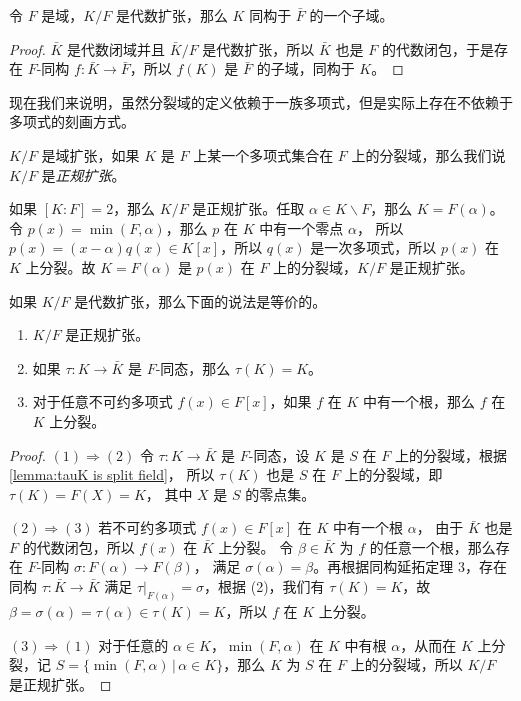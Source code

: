 \begin{corollary}
  令 $F$ 是域，$K/F$ 是代数扩张，那么 $K$ 同构于 $\bar F$ 的一个子域。
\end{corollary}
\begin{proof}
  $\bar K$ 是代数闭域并且 $\bar K/F$ 是代数扩张，所以 $\bar K$ 也是 $F$
  的代数闭包，于是存在 $F$-同构 $f: \bar K\to \bar F$，所以 $f(K)$
  是 $\bar F$ 的子域，同构于 $K$。
\end{proof}

现在我们来说明，虽然分裂域的定义依赖于一族多项式，但是实际上存在不依赖于
多项式的刻画方式。

\begin{definition}
  $K/F$ 是域扩张，如果 $K$ 是 $F$ 上某一个多项式集合在 $F$ 上的分裂域，那么我们说
  $K/F$ 是\emph{正规扩张}。
\end{definition}

\begin{example}
  如果 $[K:F]=2$，那么 $K/F$ 是正规扩张。任取 $\alpha\in K\smallsetminus F$，那么
  $K=F(\alpha)$。令 $p(x)=\min(F,\alpha)$，那么 $p$ 在 $K$ 中有一个零点 $\alpha$，
  所以 $p(x)=(x-\alpha)q(x)\in K[x]$，所以 $q(x)$ 是一次多项式，所以 $p(x)$ 在 $K$
  上分裂。故 $K=F(\alpha)$ 是 $p(x)$ 在 $F$ 上的分裂域，$K/F$ 是正规扩张。
\end{example}

\begin{theorem}\label{thm:equivalent of normal extension}
  如果 $K/F$ 是代数扩张，那么下面的说法是等价的。
  \begin{enumerate}
    \item $K/F$ 是正规扩张。
    \item 如果 $\tau: K\to\bar K$ 是 $F$-同态，那么 $\tau(K)=K$。
    \item 对于任意不可约多项式 $f(x)\in F[x]$，如果 $f$ 在 $K$ 中有一个根，那么
    $f$ 在 $K$ 上分裂。
  \end{enumerate}
\end{theorem}
\begin{proof}
  $(1)\Rightarrow (2)$ 令 $\tau:K\to\bar K$ 是 $F$-同态，设 $K$ 是 $S$
  在 $F$ 上的分裂域，根据 \autoref{lemma:tauK is split field}，
  所以 $\tau(K)$ 也是 $S$ 在 $F$ 上的分裂域，即 $\tau(K)=F(X)=K$，
  其中 $X$ 是 $S$ 的零点集。

  $(2)\Rightarrow (3)$ 若不可约多项式 $f(x)\in F[x]$ 在 $K$ 中有一个根 $\alpha$，
  由于 $\bar K$ 也是 $F$ 的代数闭包，所以 $f(x)$ 在 $\bar K$ 上分裂。
  令 $\beta\in\bar K$ 为 $f$ 的任意一个根，那么存在 $F$-同构 $\sigma:F(\alpha)\to F(\beta)$，
  满足 $\sigma(\alpha)=\beta$。再根据同构延拓定理 3，存在同构 $\tau:\bar K\to\bar K$
  满足 $\tau|_{F(\alpha)}=\sigma$，根据 (2)，我们有 $\tau(K)=K$，故
  $\beta=\sigma(\alpha)=\tau(\alpha)\in \tau(K)=K$，所以 $f$ 在 $K$ 上分裂。

  $(3)\Rightarrow (1)$ 对于任意的 $\alpha\in K$，$\min(F,\alpha)$ 在 $K$ 中有根
  $\alpha$，从而在 $K$ 上分裂，记 $S=\{\min(F,\alpha)\,|\, \alpha\in K\}$，那么
  $K$ 为 $S$ 在 $F$ 上的分裂域，所以 $K/F$ 是正规扩张。
\end{proof}

